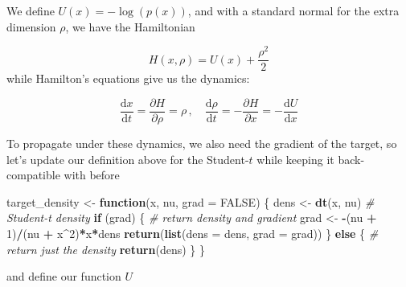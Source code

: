 \documentclass[
]{article}
\newenvironment{Shaded}{\begin{snugshade}}{\end{snugshade}}
\newcommand{\AttributeTok}[1]{\textcolor[rgb]{0.13,0.29,0.53}{#1}}
\newcommand{\CommentTok}[1]{\textcolor[rgb]{0.56,0.35,0.01}{\textit{#1}}}
\newcommand{\ConstantTok}[1]{\textcolor[rgb]{0.56,0.35,0.01}{#1}}
\newcommand{\ControlFlowTok}[1]{\textcolor[rgb]{0.13,0.29,0.53}{\textbf{#1}}}
\newcommand{\DecValTok}[1]{\textcolor[rgb]{0.00,0.00,0.81}{#1}}
\newcommand{\FunctionTok}[1]{\textcolor[rgb]{0.13,0.29,0.53}{\textbf{#1}}}
\newcommand{\NormalTok}[1]{#1}
\newcommand{\OtherTok}[1]{\textcolor[rgb]{0.56,0.35,0.01}{#1}}
\newcommand{\SpecialCharTok}[1]{\textcolor[rgb]{0.81,0.36,0.00}{\textbf{#1}}}
\begin{document}
We define \(U(x) = -\log(p(x))\), and with a standard normal for the
extra dimension \(\rho\), we have the Hamiltonian

\[H(x, \rho) = U(x) + \frac{\rho^2}{2}\] while Hamilton's equations give
us the dynamics:

\[\frac{\mathrm{d}x}{\mathrm{d}t} = \frac{\partial H}{\partial \rho} = \rho \, , \quad   \frac{\mathrm{d}\rho}{\mathrm{d}t} = -\frac{\partial H}{\partial x} = - \frac{\mathrm{d}U}{\mathrm{d}x}\]

To propagate under these dynamics, we also need the gradient of the
target, so let's update our definition above for the Student-\(t\) while
keeping it back-compatible with before

\begin{Shaded}
\begin{Highlighting}[]
\NormalTok{target\_density }\OtherTok{\textless{}{-}} \ControlFlowTok{function}\NormalTok{(x, nu, }\AttributeTok{grad =} \ConstantTok{FALSE}\NormalTok{) \{}
\NormalTok{  dens }\OtherTok{\textless{}{-}} \FunctionTok{dt}\NormalTok{(x, nu) }\CommentTok{\# Student{-}t density}
  \ControlFlowTok{if}\NormalTok{ (grad) \{ }\CommentTok{\# return density and gradient}
\NormalTok{    grad }\OtherTok{\textless{}{-}} \SpecialCharTok{{-}}\NormalTok{(nu }\SpecialCharTok{+} \DecValTok{1}\NormalTok{)}\SpecialCharTok{/}\NormalTok{(nu }\SpecialCharTok{+}\NormalTok{ x}\SpecialCharTok{\^{}}\DecValTok{2}\NormalTok{)}\SpecialCharTok{*}\NormalTok{x}\SpecialCharTok{*}\NormalTok{dens}
    \FunctionTok{return}\NormalTok{(}\FunctionTok{list}\NormalTok{(}\AttributeTok{dens =}\NormalTok{ dens, }\AttributeTok{grad =}\NormalTok{ grad))}
\NormalTok{  \} }\ControlFlowTok{else}\NormalTok{ \{ }\CommentTok{\# return just the density}
    \FunctionTok{return}\NormalTok{(dens)}
\NormalTok{  \}}
\NormalTok{\}}
\end{Highlighting}
\end{Shaded}

and define our function \(U\)

\begin{Shaded}
\end{Shaded}
\end{document}
